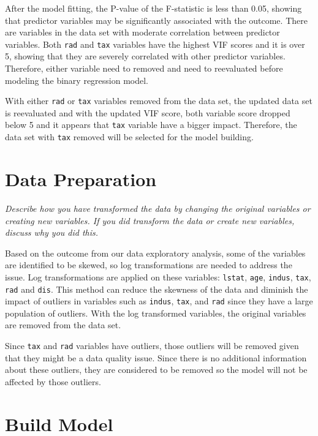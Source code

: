\documentclass[
]{article}
\begin{document}
After the model fitting, the P-value of the F-statistic is less than
0.05, showing that predictor variables may be significantly associated
with the outcome. There are variables in the data set with moderate
correlation between predictor variables. Both \texttt{rad} and
\texttt{tax} variables have the highest VIF scores and it is over 5,
showing that they are severely correlated with other predictor
variables. Therefore, either variable need to removed and need to
reevaluated before modeling the binary regression model.

With either \texttt{rad} or \texttt{tax} variables removed from the data
set, the updated data set is reevaluated and with the updated VIF score,
both variable score dropped below 5 and it appears that \texttt{tax}
variable have a bigger impact. Therefore, the data set with \texttt{tax}
removed will be selected for the model building.

\section{Data Preparation}\label{data-preparation}

\emph{Describe how you have transformed the data by changing the
original variables or creating new variables. If you did transform the
data or create new variables, discuss why you did this.}

Based on the outcome from our data exploratory analysis, some of the
variables are identified to be skewed, so log transformations are needed
to address the issue. Log transformations are applied on these
variables: \texttt{lstat}, \texttt{age}, \texttt{indus}, \texttt{tax},
\texttt{rad} and \texttt{dis}. This method can reduce the skewness of
the data and diminish the impact of outliers in variables such as
\texttt{indus}, \texttt{tax}, and \texttt{rad} since they have a large
population of outliers. With the log transformed variables, the original
variables are removed from the data set.

Since \texttt{tax} and \texttt{rad} variables have outliers, those
outliers will be removed given that they might be a data quality issue.
Since there is no additional information about these outliers, they are
considered to be removed so the model will not be affected by those
outliers.

\section{Build Model}\label{build-model}
\end{document}
